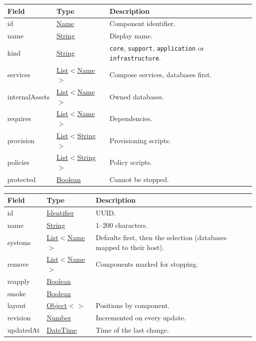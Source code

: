 \documentclass[a4paper]{arrowhead}
\newcommand{\mref}[2][]{{\textcolor{ArrowheadPurple}{\hyperref[sec:model:#2]{\ifstrempty{#1}{#2}{#1}}}}}
\newcommand{\pref}[1]{{\textcolor{ArrowheadGrey}{\hyperref[sec:model:primitives:#1]{#1}}}}
\begin{document}
\noindent\begin{tabularx}{\textwidth}{| >{\raggedright\arraybackslash}p{3.6cm} | >{\raggedright\arraybackslash\small}p{4.4cm} | X |} \hline
\rowcolor{gray!33} Field & Type & Description \\ \hline
id & \pref{Name} & Component identifier. \\ \hline
name & \pref{String} & Display name. \\ \hline
kind & \pref{String} & \texttt{core}, \texttt{support}, \texttt{application} or \texttt{infrastructure}. \\ \hline
services & \pref{List}$<$\pref{Name}$>$ & Compose services, databases first. \\ \hline
internalAssets & \pref{List}$<$\pref{Name}$>$ & Owned databases. \\ \hline
requires & \pref{List}$<$\pref{Name}$>$ & Dependencies. \\ \hline
provision & \pref{List}$<$\pref{String}$>$ & Provisioning scripts. \\ \hline
policies & \pref{List}$<$\pref{String}$>$ & Policy scripts. \\ \hline
protected & \pref{Boolean} & Cannot be stopped. \\ \hline
\end{tabularx}


\noindent\begin{tabularx}{\textwidth}{| >{\raggedright\arraybackslash}p{3.6cm} | >{\raggedright\arraybackslash\small}p{4.4cm} | X |} \hline
\rowcolor{gray!33} Field & Type & Description \\ \hline
id & \pref{Identifier} & UUID. \\ \hline
name & \pref{String} & 1--200 characters. \\ \hline
systems & \pref{List}$<$\pref{Name}$>$ & Defaults first, then the selection (databases mapped to their host). \\ \hline
remove & \pref{List}$<$\pref{Name}$>$ & Components marked for stopping. \\ \hline
reapply & \pref{Boolean} &  \\ \hline
smoke & \pref{Boolean} &  \\ \hline
layout & \pref{Object}$<$\mref{Point}$>$ & Positions by component. \\ \hline
revision & \pref{Number} & Incremented on every update. \\ \hline
updatedAt & \pref{DateTime} & Time of the last change. \\ \hline
\end{tabularx}
\end{document}
